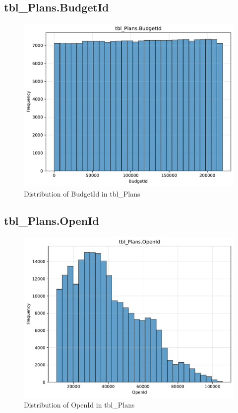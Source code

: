 \subsection{tbl\_Plans.BudgetId}

\begin{figure}[htbp]
\centering
\includegraphics[width=\textwidth]{figures/dbo_tbl_Plans_BudgetId.pdf}
\caption{Distribution of BudgetId in tbl\_Plans}
\end{figure}\newpage

\subsection{tbl\_Plans.OpenId}

\begin{figure}[htbp]
\centering
\includegraphics[width=\textwidth]{figures/dbo_tbl_Plans_OpenId.pdf}
\caption{Distribution of OpenId in tbl\_Plans}
\end{figure}\newpage

